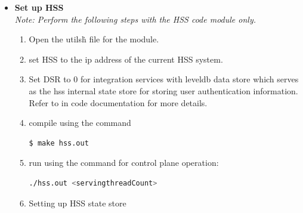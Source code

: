 \pdfminorversion=4\documentclass[hidelinks]{report}
\begin{document}
\begin{enumerate}
\begin{itemize}
\begin{enumerate}
\item Open the utils\.h file for the module.
\item set PGW1 to the ip address of the current PGW system. In case of multiple replicas for the PGW cluster, please specify the next replicas IP address ( assuming 2 more parallel replicas) as PGW2 and PGW3.
\item Set REP to 1 to enable synchronization with sibling replicas.
\item Set DSR to 0/1/2/3 for integration services with different data stores. Refer to in code documentation for more details.
\item compile using the command 
\begin{lstlisting}[language=bash]
$ make pgw.out
\end{lstlisting}
\item run using the command for control plane operation:
\begin{lstlisting}[language=bash]
./pgw.out <threadCount1> <threadCount2> 
\end{lstlisting}
threadCount\# is worker count for control plane/uplink and down link data plane

\end{enumerate}


\item \textbf{Set up HSS}\\

\textit{Note: Perform the following steps with the HSS code module only.}
\begin{enumerate}

\item Open the utils\.h file for the module.
\item set HSS to the ip address of the current HSS system.
\item Set DSR to 0 for integration services with leveldb data store which serves as the hss internal state store for storing user authentication information. Refer to in code documentation for more details.
\item compile using the command 
\begin{lstlisting}[language=bash]
$ make hss.out
\end{lstlisting}
\item run using the command for control plane operation:
\begin{lstlisting}[language=bash]
./hss.out <servingthreadCount> 
\end{lstlisting}
\clearpage
\item {Setting up HSS state store}
\begin{enumerate}


\end{enumerate}
\end{enumerate}
\end{itemize}
\end{enumerate}
\end{document}
